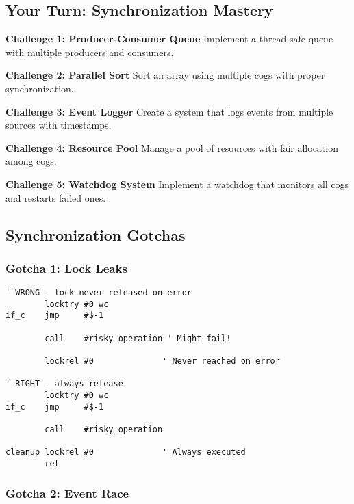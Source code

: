\documentclass[11pt]{book}
\begin{document}
\hypertarget{your-turn-synchronization-mastery}{%
\subsection{Your Turn: Synchronization
Mastery}\label{your-turn-synchronization-mastery}}

\begin{yourturn}
\textbf{Challenge 1: Producer-Consumer Queue}
Implement a thread-safe queue with multiple producers and consumers.

\textbf{Challenge 2: Parallel Sort}
Sort an array using multiple cogs with proper synchronization.

\textbf{Challenge 3: Event Logger}
Create a system that logs events from multiple sources with timestamps.

\textbf{Challenge 4: Resource Pool}
Manage a pool of resources with fair allocation among cogs.

\textbf{Challenge 5: Watchdog System}
Implement a watchdog that monitors all cogs and restarts failed ones.
\end{yourturn}

\hypertarget{synchronization-gotchas}{%
\subsection{Synchronization Gotchas}\label{synchronization-gotchas}}

\hypertarget{gotcha-1-lock-leaks}{%
\subsubsection{Gotcha 1: Lock Leaks}\label{gotcha-1-lock-leaks}}

\begin{lstlisting}
' WRONG - lock never released on error
        locktry #0 wc
if_c    jmp     #$-1
        
        call    #risky_operation ' Might fail!
        
        lockrel #0              ' Never reached on error
        
' RIGHT - always release
        locktry #0 wc
if_c    jmp     #$-1
        
        call    #risky_operation
        
cleanup lockrel #0              ' Always executed
        ret
\end{lstlisting}

\hypertarget{gotcha-2-event-race}{%
\subsubsection{Gotcha 2: Event Race}\label{gotcha-2-event-race}}
\end{document}
